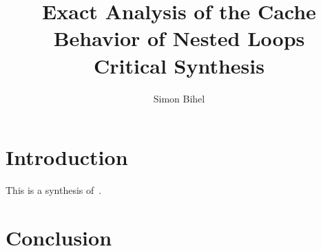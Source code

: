 \documentclass{article}
\title{Exact Analysis of the Cache Behavior of Nested Loops\\
        \large Critical Synthesis}
\author{Simon Bihel}
\begin{document}
\maketitle

\section{Introduction}
This is a synthesis of~\cite{chatterjee2001exact}.

\section{Conclusion}
\label{critic}



\end{document}
